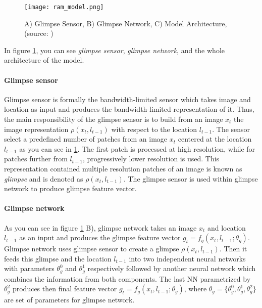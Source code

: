 \begin{figure}[H]
	\texttt{[image: ram\_model.png]}
	\caption{
		A) Glimpse Sensor,
		B) Glimpse Network,
		C) Model Architecture,
		(source: \cite{DBLP:journals/corr/MnihHGK14})
	}
	\label{img:ram_model}
\end{figure}

In figure \ref{img:ram_model}, you can see
\emph{glimpse sensor}, \emph{glimpse network}, and the whole architecture
of the model.

\paragraph{Glimpse sensor} Glimpse sensor is formally the bandwidth-limited sensor
which takes image and location as input and produces the bandwidth-limited representation of it.
Thus, the main responsibility of the glimpse sensor
is to build from an image $x_t$ the image representation $\rho(x_t, l_{t-1})$
with respect to the location $l_{t-1}$. The sensor select a predefined number of patches
 from an image $x_t$ centered at the location $l_{t-1}$ as you can see in \ref{img:ram_model}.
 The first patch is processed at high resolution, while for patches further
 from $l_{t-1}$, progressively lower resolution is used. This representation contained
 multiple resolution patches
 of an image is known as \emph{glimpse} and is denoted as $\rho(x_t, l_{t-1})$. \cite{Larochelle2010}
 The glimpse sensor is used within glimpse network to produce
  glimpse feature vector.



%
%
%


\paragraph{Glimpse network} As you can see in figure \ref{img:ram_model} B),
glimpse network takes an image $x_t$ and
location $l_{t-1}$ as an input and produces the glimpse feature vector
$g_t = f_g (x_t, l_{t-1}; \theta_g)$. Glimpse network uses glimpse sensor to
create a glimpse $\rho(x_t, l_{t-1})$. Then it feeds this glimpse and the location
$l_{t-1}$ into two independent neural networks with parameters $\theta_g^0$ and $\theta_g^1$
respectively followed by another neural network which combines the information
from both components. The last NN parametrized by $\theta_g^2$ produces then
final feature vector $g_t = f_g (x_t, l_{t-1}; \theta_g)$,
where $\theta_g = \{\theta_g^0, \theta_g^1, \theta_g^2\}$ are set of parameters
for glimpse network.

